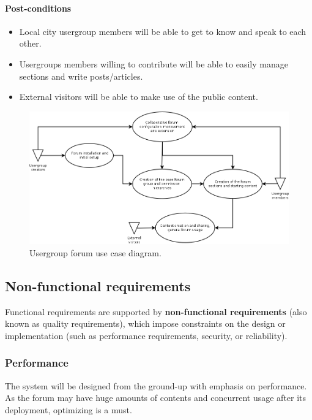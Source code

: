 \documentclass[12pt]{report}
\renewcommand\emph{\textbf}
\begin{document}
                        \paragraph{Post-conditions}
                            \begin{itemize}
                                \item Local city usergroup members will be able to get to know and speak to each other.
                                \item Usergroups members willing to contribute will be able to easily manage sections and write posts/articles.
                                \item External visitors will be able to make use of the public content.
                            \end{itemize}

                        \begin{figure}[!htb]
                        \caption{Usergroup forum use case diagram.}
                        \centering
                        \includegraphics[width=1\textwidth]{uc/uc3}
                        \end{figure}

                \subsection{Non-functional requirements}
                    Functional requirements are supported by \emph{non-functional requirements} (also known as quality requirements), which impose constraints on the design or implementation (such as performance requirements, security, or reliability).

                    \subsubsection{Performance}
                        The system will be designed from the ground-up with emphasis on performance. As the forum may have huge amounts of contents and concurrent usage after its deployment, optimizing is a must.
\end{document}
